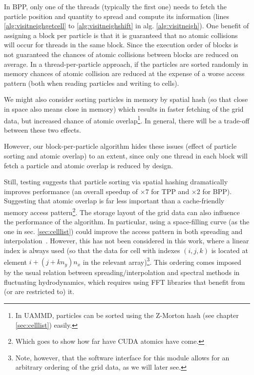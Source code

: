 \documentclass[ twoside,openright,titlepage,numbers=noenddot,%
headinclude,footinclude,cleardoublepage=empty,abstract=on,
BCOR=5mm,paper=b5,fontsize=11pt, dvipsnames
]{scrreprt}
\newcommand{\uammd}{\gls{UAMMD}\xspace}
\begin{document}
In BPP, only one of the threads (typically the first one) needs to fetch the particle position and quantity to spread and compute its information (lines \ref{alg:visitneighgetcell} to \ref{alg:visitneighshift} in alg. \ref{alg:visitneigh}).
One benefit of assigning a block per particle is that it is guaranteed that no atomic collisions will occur for threads in the same block. Since the execution order of blocks is not guaranteed the chances of atomic collisions between blocks are reduced on average.
In a thread-per-particle approach, if the particles are sorted randomly in memory chances of atomic collision are reduced at the expense of a worse access pattern (both when reading particles and writing to cells).

We might also consider sorting particles in memory by spatial hash (so that close in space also means close in memory) which results in faster fetching of the grid data, but increased chance of atomic overlap\footnote{In \uammd, particles can be sorted using the Z-Morton hash (see chapter \ref{sec:celllist}) easily.}. In general, there will be a trade-off between these two effects.

However, our block-per-particle algorithm hides these issues (effect of particle sorting and atomic overlap) to an extent, since only one thread in each block will fetch a particle and atomic overlap is reduced by design.

Still, testing suggests that particle sorting via spatial hashing dramatically improves performance (an overall speedup of $\times 7$ for TPP and $\times 2$ for BPP). Suggesting that atomic overlap is far less important than a cache-friendly memory access pattern\footnote{Which goes to show how far have CUDA atomics have come.}.
The storage layout of the grid data can also influence the performance of the algorithm. In particular, using a space-filling curve (as the one in sec. \ref{sec:celllist}) could improve the access pattern in both spreading and interpolation~\cite{Shih2021}. However, this has not been considered in this work, where a linear index is always used (so that the data for cell with indexes $(i,j,k)$ is located at element $i+(j+kn_y)n_x$ in the relevant array)\footnote{Note, however, that the software interface for this module allows for an arbitrary ordering of the grid data, as we will later see.}. This ordering comes imposed by the usual relation between spreading/interpolation and spectral methods in fluctuating hydrodynamics, which requires using \gls{FFT} libraries that benefit from (or are restricted to) it.
\end{document}
